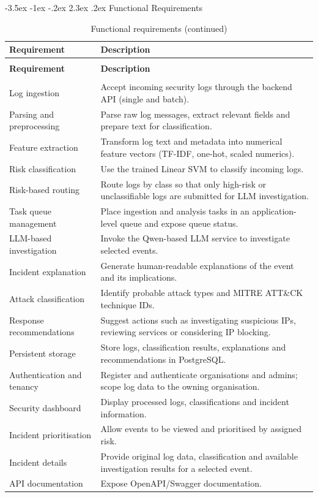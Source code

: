 \documentclass[12pt,a4paper]{report}
\makeatletter
\renewcommand{\arraystretch}{1.05}
\renewcommand\section{\@startsection {section}{1}{\z@}%
  {-3.5ex \@plus -1ex \@minus -.2ex}%
  {2.3ex \@plus .2ex}%
  {\normalfont\fontsize{17}{21}\selectfont\bfseries}}
\makeatother
\begin{document}
\section{Functional Requirements}
\small
\renewcommand{\arraystretch}{1.2}
\begin{longtable}{>{\raggedright\arraybackslash}p{3.6cm} >{\raggedright\arraybackslash}p{12.1cm}}
\caption{Functional requirements}
\label{tab:fr}\\
\toprule
\textbf{Requirement} & \textbf{Description}\\
\midrule
\endfirsthead
\caption[]{Functional requirements (continued)}\\
\toprule
\textbf{Requirement} & \textbf{Description}\\
\midrule
\endhead
\midrule
\multicolumn{2}{r}{Continued on next page}\\
\endfoot
\bottomrule
\endlastfoot
Log ingestion & Accept incoming security logs through the backend API (single and batch).\\
Parsing and preprocessing & Parse raw log messages, extract relevant fields and prepare text for classification.\\
Feature extraction & Transform log text and metadata into numerical feature vectors (TF-IDF, one-hot, scaled numerics).\\
Risk classification & Use the trained Linear SVM to classify incoming logs.\\
Risk-based routing & Route logs by class so that only high-risk or unclassifiable logs are submitted for LLM investigation.\\
Task queue management & Place ingestion and analysis tasks in an application-level queue and expose queue status.\\
LLM-based investigation & Invoke the Qwen-based LLM service to investigate selected events.\\
Incident explanation & Generate human-readable explanations of the event and its implications.\\
Attack classification & Identify probable attack types and MITRE ATT\&CK technique IDs.\\
Response recommendations & Suggest actions such as investigating suspicious IPs, reviewing services or considering IP blocking.\\
Persistent storage & Store logs, classification results, explanations and recommendations in PostgreSQL.\\
Authentication and tenancy & Register and authenticate organisations and admins; scope log data to the owning organisation.\\
Security dashboard & Display processed logs, classifications and incident information.\\
Incident prioritisation & Allow events to be viewed and prioritised by assigned risk.\\
Incident details & Provide original log data, classification and available investigation results for a selected event.\\
API documentation & Expose OpenAPI/Swagger documentation.\\
\end{longtable}
\normalsize
\end{document}
